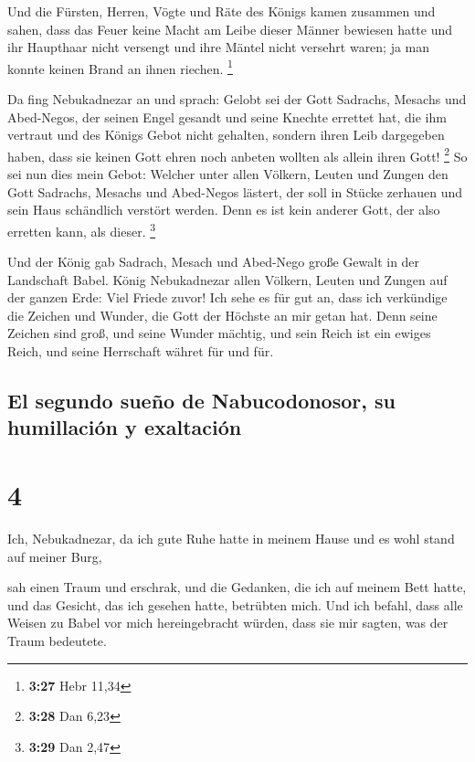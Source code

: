 Und die Fürsten, Herren, Vögte und Räte des Königs kamen
zusammen und sahen, dass das Feuer keine Macht am Leibe dieser Männer
bewiesen hatte und ihr Haupthaar nicht versengt und ihre Mäntel nicht
versehrt waren; ja man konnte keinen Brand an ihnen riechen. \footnote{\textbf{3:27}
  Hebr 11,34}

 Da fing Nebukadnezar an und sprach: Gelobt sei der Gott
Sadrachs, Mesachs und Abed-Negos, der seinen Engel gesandt und seine
Knechte errettet hat, die ihm vertraut und des Königs Gebot nicht
gehalten, sondern ihren Leib dargegeben haben, dass sie keinen Gott
ehren noch anbeten wollten als allein ihren Gott! \footnote{\textbf{3:28}
  Dan 6,23}  So sei nun dies mein Gebot: Welcher unter
allen Völkern, Leuten und Zungen den Gott Sadrachs, Mesachs und
Abed-Negos lästert, der soll in Stücke zerhauen und sein Haus schändlich
verstört werden. Denn es ist kein anderer Gott, der also erretten kann,
als dieser. \footnote{\textbf{3:29} Dan 2,47}

 Und der König gab Sadrach, Mesach und Abed-Nego große
Gewalt in der Landschaft Babel.  König Nebukadnezar allen
Völkern, Leuten und Zungen auf der ganzen Erde: Viel Friede zuvor!
 Ich sehe es für gut an, dass ich verkündige die Zeichen
und Wunder, die Gott der Höchste an mir getan hat.  Denn
seine Zeichen sind groß, und seine Wunder mächtig, und sein Reich ist
ein ewiges Reich, und seine Herrschaft währet für und für.

\hypertarget{el-segundo-sueuxf1o-de-nabucodonosor-su-humillaciuxf3n-y-exaltaciuxf3n}{%
\subsection{El segundo sueño de Nabucodonosor, su humillación y
exaltación}\label{el-segundo-sueuxf1o-de-nabucodonosor-su-humillaciuxf3n-y-exaltaciuxf3n}}

\hypertarget{section-3}{%
\section{4}\label{section-3}}

 Ich, Nebukadnezar, da ich gute Ruhe hatte in meinem Hause
und es wohl stand auf meiner Burg,

 sah einen Traum und erschrak, und die Gedanken, die ich
auf meinem Bett hatte, und das Gesicht, das ich gesehen hatte, betrübten
mich.  Und ich befahl, dass alle Weisen zu Babel vor mich
hereingebracht würden, dass sie mir sagten, was der Traum bedeutete.

